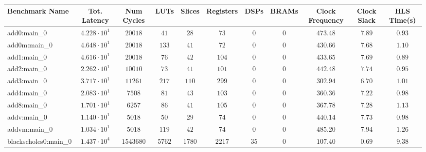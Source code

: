 \begin{tabular}{|l|c|c|c|c|c|c|c|c|c|c|}
\hline
Benchmark Name                 & Tot. Latency           & Num Cycles   & LUTs       & Slices     & Registers  & DSPs     & BRAMs    & Clock Frequency & Clock Slack & HLS Time(s) \\
\hline
add0:main\_0                   & $ 4.228 \cdot 10^{1} $ & $ 20018    $ & $ 41     $ & $ 28     $ & $ 73     $ & $ 0    $ & $ 0    $ & $ 473.48      $ & $ 7.89    $ & $ 0.93    $ \\
add0m:main\_0                  & $ 4.648 \cdot 10^{1} $ & $ 20018    $ & $ 133    $ & $ 41     $ & $ 72     $ & $ 0    $ & $ 0    $ & $ 430.66      $ & $ 7.68    $ & $ 1.10    $ \\
add1:main\_0                   & $ 4.616 \cdot 10^{1} $ & $ 20018    $ & $ 76     $ & $ 42     $ & $ 104    $ & $ 0    $ & $ 0    $ & $ 433.65      $ & $ 7.69    $ & $ 0.89    $ \\
add2:main\_0                   & $ 2.262 \cdot 10^{1} $ & $ 10010    $ & $ 73     $ & $ 41     $ & $ 101    $ & $ 0    $ & $ 0    $ & $ 442.48      $ & $ 7.74    $ & $ 0.95    $ \\
add3:main\_0                   & $ 3.717 \cdot 10^{1} $ & $ 11261    $ & $ 217    $ & $ 110    $ & $ 299    $ & $ 0    $ & $ 0    $ & $ 302.94      $ & $ 6.70    $ & $ 1.01    $ \\
add4:main\_0                   & $ 2.083 \cdot 10^{1} $ & $ 7508     $ & $ 81     $ & $ 43     $ & $ 103    $ & $ 0    $ & $ 0    $ & $ 360.36      $ & $ 7.22    $ & $ 0.98    $ \\
add8:main\_0                   & $ 1.701 \cdot 10^{1} $ & $ 6257     $ & $ 86     $ & $ 41     $ & $ 105    $ & $ 0    $ & $ 0    $ & $ 367.78      $ & $ 7.28    $ & $ 1.13    $ \\
addv:main\_0                   & $ 1.140 \cdot 10^{1} $ & $ 5018     $ & $ 50     $ & $ 29     $ & $ 74     $ & $ 0    $ & $ 0    $ & $ 440.14      $ & $ 7.73    $ & $ 0.98    $ \\
addvm:main\_0                  & $ 1.034 \cdot 10^{1} $ & $ 5018     $ & $ 119    $ & $ 42     $ & $ 74     $ & $ 0    $ & $ 0    $ & $ 485.20      $ & $ 7.94    $ & $ 1.26    $ \\
blackscholes0:main\_0          & $ 1.437 \cdot 10^{4} $ & $ 1543680  $ & $ 5762   $ & $ 1780   $ & $ 2217   $ & $ 35   $ & $ 0    $ & $ 107.40      $ & $ 0.69    $ & $ 9.38    $ \\

\end{tabular}
